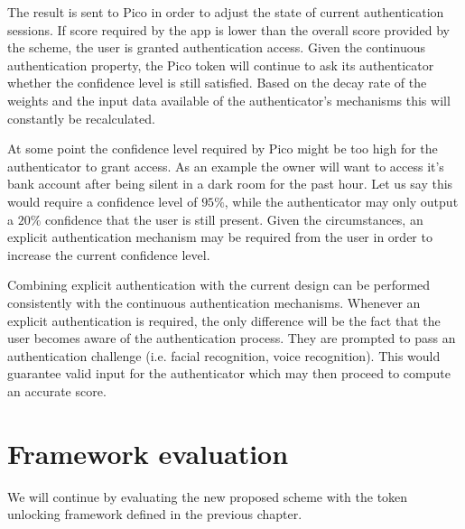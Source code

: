 The result is sent to Pico in order to adjust the state of current authentication sessions. If score required by the app is lower than the overall score provided by the scheme, the user is granted authentication access. Given the continuous authentication property, the Pico token will continue to ask its authenticator whether the confidence level is still satisfied. Based on the decay rate of the weights and the input data available of the authenticator's mechanisms this will constantly be recalculated.

At some point the confidence level required by Pico might be too high for the authenticator to grant access. As an example the owner will want to access it's bank account after being silent in a dark room for the past hour. Let us say this would require a confidence level of $95\%$, while the authenticator may only output a $20\%$ confidence that the user is still present. Given the circumstances, an explicit authentication mechanism may be required from the user in order to increase the current confidence level. 

Combining explicit authentication with the current design can be performed consistently with the continuous authentication mechanisms. Whenever an explicit authentication is required, the only difference will be the fact that the user becomes aware of the authentication process. They are prompted to pass an authentication challenge (i.e. facial recognition, voice recognition). This would guarantee valid input for the authenticator which may then proceed to compute an accurate score.

\section{Framework evaluation}
We will continue by evaluating the new proposed scheme with the token unlocking framework defined in the previous chapter. 

